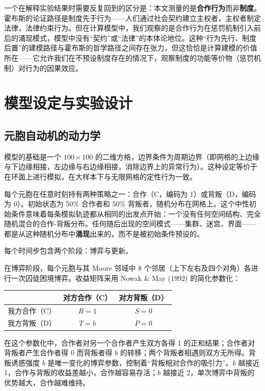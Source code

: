 \documentclass[12pt,a4paper]{ctexart}
\begin{document}
一个在解释实验结果时需要反复回到的区分是：本文测量的是\textbf{合作行为}而非\textbf{制度}。霍布斯的论证路径是制度先于行为——人们通过社会契约建立主权者，主权者制定法律，法律约束行为。但在计算模型中，我们观察的是合作行为在惩罚机制引入前后的涌现模式，模型中没有“契约”或“法律”的本体论地位。这种“行为先行、制度后置”的建模路径与霍布斯的哲学路径之间存在张力，但这恰恰是计算建模的价值所在——它允许我们在不预设制度存在的情况下，观察制度的功能等价物（惩罚机制）对行为的因果效应。

\section{模型设定与实验设计}

\subsection{元胞自动机的动力学}

模型的基础是一个 $100 \times 100$ 的二维方格，边界条件为周期边界（即网格的上边缘与下边缘相接，左边缘与右边缘相接，消除边界上的异常行为）。这种设定等价于在环面上进行模拟，在大样本下与无限网格的定性行为一致。

每个元胞在任意时刻持有两种策略之一：合作（C，编码为 1）或背叛（D，编码为 0）。初始状态为 50\% 合作者和 50\% 背叛者，随机分布在网格上。这个中性初始条件意味着每条模拟轨迹都从相同的出发点开始：一个没有任何空间结构、完全随机混合的合作-背叛分布。任何随后出现的空间模式——集群、迷宫、界面——都是从这种随机分布中\textbf{涌现}出来的，而不是被初始条件预设的。

每个时间步包含两个阶段：博弈与更新。

在博弈阶段，每个元胞与其 Moore 邻域中 8 个邻居（上下左右及四个对角）各进行一次囚徒困境博弈。收益矩阵采用 Nowak \& May (1992) 的简化参数化：

\begin{center}
\begin{tabular}{c|cc}
& 对方合作（C） & 对方背叛（D） \\
\midrule
我方合作（C） & $R=1$ & $S=0$ \\
我方背叛（D） & $T=b$ & $P=0$ \\
\end{tabular}
\end{center}

在这个参数化中，合作者对另一个合作者产生双方各得 1 的正和结果；合作者对背叛者产生合作者得 0 而背叛者得 $b$ 的转移；两个背叛者相遇则双方无所得。背叛诱惑强度 $b$ 是唯一变化的博弈参数，控制着“背叛相对合作的吸引力”。$b$ 越接近 1，合作与背叛的收益差越小，合作越容易存活；$b$ 越接近 2，单次博弈中背叛的优势越大，合作越难维持。
\end{document}
